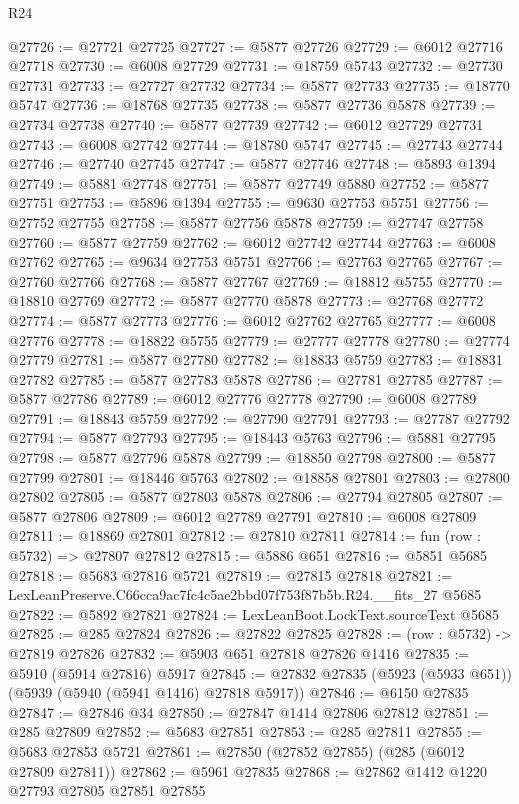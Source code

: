 \begin{lexlean}{R24}
\begin{coremodule}
@27726 := @27721 @27725
@27727 := @5877 @27726
@27729 := @6012 @27716 @27718
@27730 := @6008 @27729
@27731 := @18759 @5743
@27732 := @27730 @27731
@27733 := @27727 @27732
@27734 := @5877 @27733
@27735 := @18770 @5747
@27736 := @18768 @27735
@27738 := @5877 @27736 @5878
@27739 := @27734 @27738
@27740 := @5877 @27739
@27742 := @6012 @27729 @27731
@27743 := @6008 @27742
@27744 := @18780 @5747
@27745 := @27743 @27744
@27746 := @27740 @27745
@27747 := @5877 @27746
@27748 := @5893 @1394
@27749 := @5881 @27748
@27751 := @5877 @27749 @5880
@27752 := @5877 @27751
@27753 := @5896 @1394
@27755 := @9630 @27753 @5751
@27756 := @27752 @27755
@27758 := @5877 @27756 @5878
@27759 := @27747 @27758
@27760 := @5877 @27759
@27762 := @6012 @27742 @27744
@27763 := @6008 @27762
@27765 := @9634 @27753 @5751
@27766 := @27763 @27765
@27767 := @27760 @27766
@27768 := @5877 @27767
@27769 := @18812 @5755
@27770 := @18810 @27769
@27772 := @5877 @27770 @5878
@27773 := @27768 @27772
@27774 := @5877 @27773
@27776 := @6012 @27762 @27765
@27777 := @6008 @27776
@27778 := @18822 @5755
@27779 := @27777 @27778
@27780 := @27774 @27779
@27781 := @5877 @27780
@27782 := @18833 @5759
@27783 := @18831 @27782
@27785 := @5877 @27783 @5878
@27786 := @27781 @27785
@27787 := @5877 @27786
@27789 := @6012 @27776 @27778
@27790 := @6008 @27789
@27791 := @18843 @5759
@27792 := @27790 @27791
@27793 := @27787 @27792
@27794 := @5877 @27793
@27795 := @18443 @5763
@27796 := @5881 @27795
@27798 := @5877 @27796 @5878
@27799 := @18850 @27798
@27800 := @5877 @27799
@27801 := @18446 @5763
@27802 := @18858 @27801
@27803 := @27800 @27802
@27805 := @5877 @27803 @5878
@27806 := @27794 @27805
@27807 := @5877 @27806
@27809 := @6012 @27789 @27791
@27810 := @6008 @27809
@27811 := @18869 @27801
@27812 := @27810 @27811
@27814 := fun (row : @5732) => @27807 @27812
@27815 := @5886 @651
@27816 := @5851 @5685
@27818 := @5683 @27816 @5721
@27819 := @27815 @27818
@27821 := LexLeanPreserve.C66cca9ac7fc4c5ae2bbd07f753f87b5b.R24.__fits_27 @5685
@27822 := @5892 @27821
@27824 := LexLeanBoot.LockText.sourceText @5685
@27825 := @285 @27824
@27826 := @27822 @27825
@27828 := (row : @5732) -> @27819 @27826
@27832 := @5903 @651 @27818 @27826 @1416
@27835 := @5910 (@5914 @27816) @5917
@27845 := @27832 @27835 (@5923 (@5933 @651)) (@5939 (@5940 (@5941 @1416) @27818 @5917))
@27846 := @6150 @27835
@27847 := @27846 @34
@27850 := @27847 @1414 @27806 @27812
@27851 := @285 @27809
@27852 := @5683 @27851
@27853 := @285 @27811
@27855 := @5683 @27853 @5721
@27861 := @27850 (@27852 @27855) (@285 (@6012 @27809 @27811))
@27862 := @5961 @27835
@27868 := @27862 @1412 @1220 @27793 @27805 @27851 @27855

\end{coremodule}
\end{lexlean}
